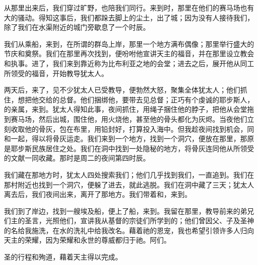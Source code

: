 从那里出来后，我们穿过旷野，也陪我们同行。来到时，那里在他们的赛马场也有大的骚动。得知这事后，我们都跺去脚上的尘土，出了城；因为没有人接待我们，除了我们在水渠附近的城门旁歇息了一个时辰。\par

我们从乘船，来到，在所谓的群岛上岸，那里一个地方满布偶像；那里举行盛大的节庆和奠祭。我们在那里再次找到，便吩咐他宣讲天主的福音，并在那里设立教会和执事。进了，我们来到靠近称为比布利亚之地的会堂；进去之后，展开他从同工所领受的福音，开始教导犹太人。\par

两天后，来了，见不少犹太人已受教导，便勃然大怒，聚集全体犹太人；他们抓住，想把他交给的总督。他们捆绑他，要带去见总督；正巧有个虔诚的耶步斯人，的亲属，来到。犹太人得知此事，夜间抓住，用绳子捆住他的脖子，把他从会堂拖到赛马场，然后出城，围住他，用火烧他，甚至他的骨头都化为灰烬。当夜他们立刻收取他的骨灰，包在布里，用铅封好，打算投入海中。但我趁夜间找到机会，同和一起，得以将骨灰运走。我们来到一个地方，找到一个洞穴，便放在那里，那原是耶步斯民族居住之处。我们在洞中找到一处隐秘的地方，将骨灰连同他从所领受的文献一同收藏。那时是周二的夜间第四时辰。\par

我们藏在那地方时，犹太人四处搜索我们；他们几乎找到我们，一直追到。我们在那村附近也找到一个洞穴，便躲了进去，就此逃脱。我们在洞中藏了三天；犹太人离去后，我们夜间出来，离开了那地方。我们带着和，来到。\par

我们到了岸边，找到一艘埃及船，便上了船，来到。我留在那里，教导前来的弟兄们主的圣言，光照他们，宣讲我从基督的宗徒们所学到的；他们曾因父、子及圣神的名给我施洗，在水的洗礼中给我改名。藉着祂的恩宠，我也希望引领许多人归向天主的荣耀，因为荣耀和永世的尊威都归于祂。阿们。\par

圣的行程和殉道，藉着天主得以完成。\par

